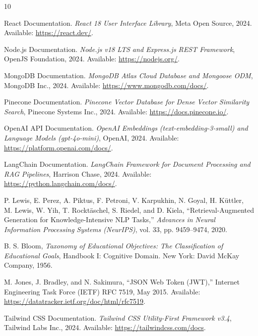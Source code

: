 \begin{thebibliography}{10}

React Documentation. \textit{React 18 User Interface Library}, Meta Open Source, 2024. Available: \url{https://react.dev/}.

Node.js Documentation. \textit{Node.js v18 LTS and Express.js REST Framework}, OpenJS Foundation, 2024. Available: \url{https://nodejs.org/}.

MongoDB Documentation. \textit{MongoDB Atlas Cloud Database and Mongoose ODM}, MongoDB Inc., 2024. Available: \url{https://www.mongodb.com/docs/}.

Pinecone Documentation. \textit{Pinecone Vector Database for Dense Vector Similarity Search}, Pinecone Systems Inc., 2024. Available: \url{https://docs.pinecone.io/}.

OpenAI API Documentation. \textit{OpenAI Embeddings (text-embedding-3-small) and Language Models (gpt-4o-mini)}, OpenAI, 2024. Available: \url{https://platform.openai.com/docs/}.

LangChain Documentation. \textit{LangChain Framework for Document Processing and RAG Pipelines}, Harrison Chase, 2024. Available: \url{https://python.langchain.com/docs/}.

P. Lewis, E. Perez, A. Piktus, F. Petroni, V. Karpukhin, N. Goyal, H. Küttler, M. Lewis, W. Yih, T. Rocktäschel, S. Riedel, and D. Kiela, ``Retrieval-Augmented Generation for Knowledge-Intensive NLP Tasks,'' \textit{Advances in Neural Information Processing Systems (NeurIPS)}, vol. 33, pp. 9459--9474, 2020.

B. S. Bloom, \textit{Taxonomy of Educational Objectives: The Classification of Educational Goals}, Handbook I: Cognitive Domain. New York: David McKay Company, 1956.

M. Jones, J. Bradley, and N. Sakimura, ``JSON Web Token (JWT),'' Internet Engineering Task Force (IETF) RFC 7519, May 2015. Available: \url{https://datatracker.ietf.org/doc/html/rfc7519}.

Tailwind CSS Documentation. \textit{Tailwind CSS Utility-First Framework v3.4}, Tailwind Labs Inc., 2024. Available: \url{https://tailwindcss.com/docs}.

\end{thebibliography}
